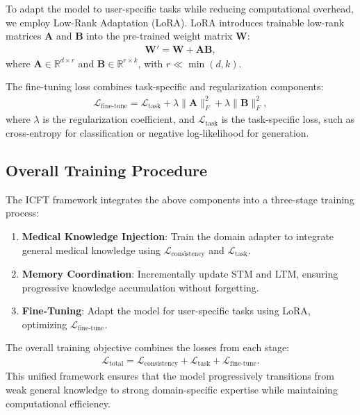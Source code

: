 To adapt the model to user-specific tasks while reducing computational overhead, we employ Low-Rank Adaptation (LoRA). LoRA introduces trainable low-rank matrices \( \mathbf{A} \) and \( \mathbf{B} \) into the pre-trained weight matrix \( \mathbf{W} \):
\begin{align}
\mathbf{W}' = \mathbf{W} + \mathbf{A} \mathbf{B},
\end{align}
where \( \mathbf{A} \in \mathbb{R}^{d \times r} \) and \( \mathbf{B} \in \mathbb{R}^{r \times k} \), with \( r \ll \min(d, k) \).

The fine-tuning loss combines task-specific and regularization components:
\begin{align}
\mathcal{L}_{\text{fine-tune}} = \mathcal{L}_{\text{task}} + \lambda \| \mathbf{A} \|_F^2 + \lambda \| \mathbf{B} \|_F^2,
\end{align}
where \( \lambda \) is the regularization coefficient, and \( \mathcal{L}_{\text{task}} \) is the task-specific loss, such as cross-entropy for classification or negative log-likelihood for generation.

\subsection{Overall Training Procedure}

The ICFT framework integrates the above components into a three-stage training process:
\begin{enumerate}
    \item \textbf{Medical Knowledge Injection}: Train the domain adapter to integrate general medical knowledge using \( \mathcal{L}_{\text{consistency}} \) and \( \mathcal{L}_{\text{task}} \).
    \item \textbf{Memory Coordination}: Incrementally update STM and LTM, ensuring progressive knowledge accumulation without forgetting.
    \item \textbf{Fine-Tuning}: Adapt the model for user-specific tasks using LoRA, optimizing \( \mathcal{L}_{\text{fine-tune}} \).
\end{enumerate}

The overall training objective combines the losses from each stage:
\begin{align}
\mathcal{L}_{\text{total}} = \mathcal{L}_{\text{consistency}} + \mathcal{L}_{\text{task}} + \mathcal{L}_{\text{fine-tune}}.
\end{align}
This unified framework ensures that the model progressively transitions from weak general knowledge to strong domain-specific expertise while maintaining computational efficiency.


